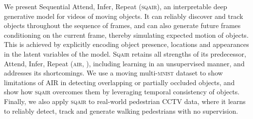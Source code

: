 We present Sequential Attend, Infer, Repeat (\textsc{sqair}), an interpretable deep generative model for videos of moving objects.
It can reliably discover and track objects throughout the sequence of frames, and can also generate future frames conditioning on the current frame, thereby simulating expected motion of objects. 
This is achieved by explicitly encoding object presence, locations and appearances in the latent variables of the model.
\textsc{Sqair} retains all strengths of its predecessor, Attend, Infer, Repeat (\textsc{air}, \cite{Eslami2016air}), including learning in an unsupervised manner, and addresses its shortcomings.
We use a moving multi-\textsc{mnist} dataset to show limitations of AIR in detecting overlapping or partially occluded objects, and show how \textsc{sqair} overcomes them by leveraging temporal consistency of objects.
Finally, we also apply \textsc{sqair} to real-world pedestrian CCTV data, where it learns to reliably detect, track and generate walking pedestrians with no supervision.